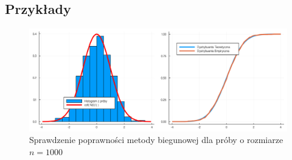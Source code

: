 \documentclass[12pt]{mwrep}
\begin{document}
	\subsection{Przykłady}

	\begin{figure}[H]\caption{Sprawdzenie poprawności metody biegunowej dla próby o rozmiarze $n=1000$}\label{fig:pol}
		\includegraphics[width=\columnwidth]{fig/fig_pol.png}
	\end{figure}
\end{document}
